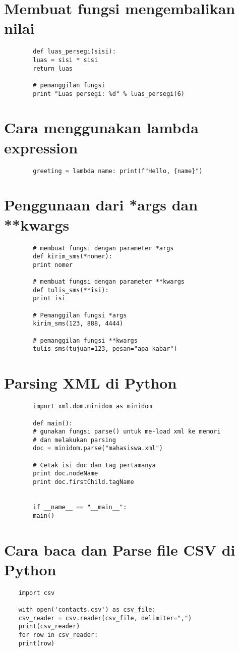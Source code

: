 \documentclass{article}
\begin{document}
	\section{Membuat fungsi mengembalikan nilai}
	\begin{lstlisting}
		def luas_persegi(sisi):
		luas = sisi * sisi
		return luas
		
		# pemanggilan fungsi
		print "Luas persegi: %d" % luas_persegi(6)
	\end{lstlisting}

	\section{Cara menggunakan lambda expression}
	\begin{lstlisting}
		greeting = lambda name: print(f"Hello, {name}") 
	\end{lstlisting}

	\section{Penggunaan dari *args dan **kwargs}
	\begin{lstlisting}
		# membuat fungsi dengan parameter *args
		def kirim_sms(*nomer):
		print nomer
		
		# membuat fungsi dengan parameter **kwargs
		def tulis_sms(**isi):
		print isi
		
		# Pemanggilan fungsi *args
		kirim_sms(123, 888, 4444)
		
		# pemanggilan fungsi **kwargs
		tulis_sms(tujuan=123, pesan="apa kabar")
	\end{lstlisting}

	\section{Parsing XML di Python}
	\begin{lstlisting}
		import xml.dom.minidom as minidom
		
		def main():
		# gunakan fungsi parse() untuk me-load xml ke memori 
		# dan melakukan parsing
		doc = minidom.parse("mahasiswa.xml")
		
		# Cetak isi doc dan tag pertamanya
		print doc.nodeName
		print doc.firstChild.tagName
		
		
		if __name__ == "__main__":
		main()
	\end{lstlisting}

	\section{Cara baca dan Parse file CSV di Python}
	\begin{lstlisting}
	import csv
	
	with open('contacts.csv') as csv_file:
	csv_reader = csv.reader(csv_file, delimiter=",")
	print(csv_reader)
	for row in csv_reader:
	print(row)
	\end{lstlisting}
	
\end{document}
